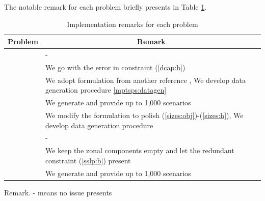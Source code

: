 The notable remark for each problem briefly presents in Table \ref{table:remarks}.
\begin{table}[H]
	\centering
		\begin{threeparttable}
			\caption{Implementation remarks for each problem}
			\label{table:remarks}
			\begin{tabular}{@{}lp{3in}}
				\toprule
				Problem & \multicolumn{1}{c}{Remark}                                                \\ \midrule
				\airlift & -\\
				\dcap   & We go with the error in constraint (\ref{dcap:b})                                              \\
				\mptsps & We adopt formulation from another reference \cite{journal:LSD1990}, We develop data generation procedure \ref{mptsps:datagen} \\
				\sdcp & We generate and provide up to 1,000 scenarios\\
				\sizes  &  We modify the formulation to polish (\ref{sizes:obj})-(\ref{sizes:h}), We develop data generation procedure                                                 \\
				\smkp   & -                                                                         \\
				\sslp   & We keep the zonal components empty and let the redundant constraint (\ref{sslp:b}) present                                     \\
				\suc    & We generate and provide up to 1,000 scenarios                              \\ \bottomrule
			\end{tabular}
			\begin{tablenotes}
				\small
				\item Remark. - means no issue presents
			\end{tablenotes}
		\end{threeparttable}
\end{table}

